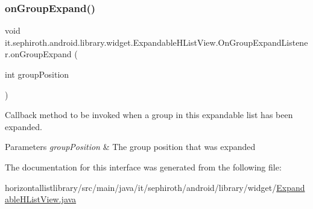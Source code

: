 \subsubsection{\texorpdfstring{on\+Group\+Expand()}{onGroupExpand()}}
{\footnotesize\ttfamily void it.\+sephiroth.\+android.\+library.\+widget.\+Expandable\+H\+List\+View.\+On\+Group\+Expand\+Listener.\+on\+Group\+Expand (\begin{DoxyParamCaption}\item[{int}]{group\+Position }\end{DoxyParamCaption})}

Callback method to be invoked when a group in this expandable list has been expanded.


\begin{DoxyParams}{Parameters}
{\em group\+Position} & The group position that was expanded \\
\hline
\end{DoxyParams}


The documentation for this interface was generated from the following file\+:\begin{DoxyCompactItemize}
\item 
horizontallistlibrary/src/main/java/it/sephiroth/android/library/widget/\hyperlink{_expandable_h_list_view_8java}{Expandable\+H\+List\+View.\+java}\end{DoxyCompactItemize}
